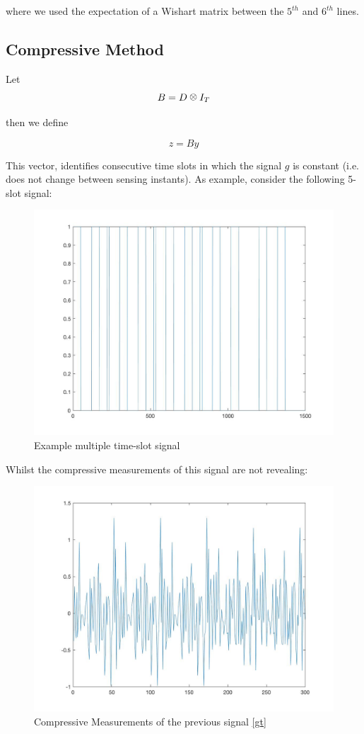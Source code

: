 where we used the expectation of a Wishart matrix between the \(5^{th}\) and \(6^{th}\) lines.


\subsection{Compressive Method}
\begin{definition}
Let
\begin{equation}
B = D \kronecker I_T
\end{equation}

then we define 

\begin{equation}
z = By
\end{equation}
\label{period vector}

This vector, identifies consecutive time slots in which the signal \(g\) is constant (i.e. does not change between sensing instants). As example, consider the following 5-slot signal:

\begin{figure}[h]
\centering
\includegraphics[height = 7.3 cm]{gt.jpg}
\caption{Example multiple time-slot signal}
\label{fig:gt}
\end{figure}

Whilst the compressive measurements of this signal are not revealing:

\begin{figure}[h]
\centering
\includegraphics[height = 7.3 cm]{gt-compressed.jpg}
\caption{Compressive Measurements of the previous signal \ref{gt}}
\label{fig:ygt}
\end{figure}


\end{definition}
